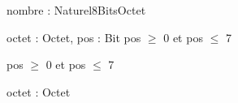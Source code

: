 \begin{algorithme}
        
        {nombre : Naturel8Bits}{Octet}
        {}

        {octet : Octet, pos : \naturelNonNul}{Bit}
        {pos $\geq$ 0 et pos $\leq$ 7}
    
        {
        }
        {pos $\geq$ 0 et pos $\leq$ 7}
    
        {octet : Octet}{\naturel}
        {}

\end{algorithme}
 
